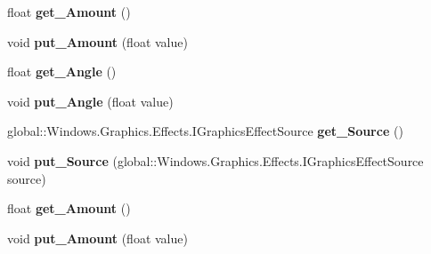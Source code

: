 \begin{DoxyCompactItemize}
float {\bfseries get\+\_\+\+Amount} ()
\item 
\mbox{\label{interface_microsoft_1_1_graphics_1_1_canvas_1_1_effects_1_1_i_emboss_effect_af365bd3a8f1fa96d24219c0d6150c0af}} 
void {\bfseries put\+\_\+\+Amount} (float value)
\item 
\mbox{\label{interface_microsoft_1_1_graphics_1_1_canvas_1_1_effects_1_1_i_emboss_effect_a40c6db54f51aa5bc19649ee456d1afd4}} 
float {\bfseries get\+\_\+\+Angle} ()
\item 
\mbox{\label{interface_microsoft_1_1_graphics_1_1_canvas_1_1_effects_1_1_i_emboss_effect_aa128a0cacc6e71db4b51016111649d41}} 
void {\bfseries put\+\_\+\+Angle} (float value)
\item 
\mbox{\label{interface_microsoft_1_1_graphics_1_1_canvas_1_1_effects_1_1_i_emboss_effect_adf3fd330425fb1ca6fcf9bf2b14f108f}} 
global\+::\+Windows.\+Graphics.\+Effects.\+I\+Graphics\+Effect\+Source {\bfseries get\+\_\+\+Source} ()
\item 
\mbox{\label{interface_microsoft_1_1_graphics_1_1_canvas_1_1_effects_1_1_i_emboss_effect_a0beba0a5351e5945a4d86ac4e850ffba}} 
void {\bfseries put\+\_\+\+Source} (global\+::\+Windows.\+Graphics.\+Effects.\+I\+Graphics\+Effect\+Source source)
\item 
\mbox{\label{interface_microsoft_1_1_graphics_1_1_canvas_1_1_effects_1_1_i_emboss_effect_a1335600c5f13152a8846556dd82a3c6a}} 
float {\bfseries get\+\_\+\+Amount} ()
\item 
\mbox{\label{interface_microsoft_1_1_graphics_1_1_canvas_1_1_effects_1_1_i_emboss_effect_af365bd3a8f1fa96d24219c0d6150c0af}} 
void {\bfseries put\+\_\+\+Amount} (float value)
\item 

\end{DoxyCompactItemize}
